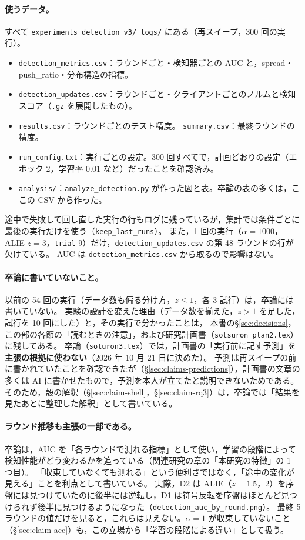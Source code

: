 \documentclass[a4j, dvipdfmx]{jsarticle}  %
\begin{document}
\paragraph{使うデータ。}
すべて \texttt{experiments\_detection\_v3/\_logs/} にある（再スイープ，300 回の実行）。
\begin{itemize}
  \item \texttt{detection\_metrics.csv}：ラウンドごと・検知器ごとの AUC と，spread・push\_ratio・分布構造の指標。
  \item \texttt{detection\_updates.csv}：ラウンドごと・クライアントごとのノルムと検知スコア（\texttt{.gz} を展開したもの）。
  \item \texttt{results.csv}：ラウンドごとのテスト精度。 \texttt{summary.csv}：最終ラウンドの精度。
  \item \texttt{run\_config.txt}：実行ごとの設定。300 回すべてで，計画どおりの設定（エポック 2，学習率 0.01 など）だったことを確認済み。
  \item \texttt{analysis/}：\texttt{analyze\_detection.py} が作った図と表。卒論の表の多くは，ここの CSV から作った。
\end{itemize}
途中で失敗して回し直した実行の行もログに残っているが，集計では条件ごとに最後の実行だけを使う（\texttt{keep\_last\_runs}）。
また，1 回の実行（$\alpha = 1000$，ALIE $z = 3$，\texttt{trial} 9）だけ，\texttt{detection\_updates.csv} の第 48 ラウンドの行が欠けている。
AUC は \texttt{detection\_metrics.csv} から取るので影響はない。

\paragraph{卒論に書いていないこと。}
以前の 54 回の実行（データ数も偏る分け方，$z \le 1$，各 3 試行）は，卒論には書いていない。
実験の設計を変えた理由（データ数を揃えた，$z > 1$ を足した，試行を 10 回にした）と，その実行で分かったことは，
本書の\S\ref{sec:decisions}，この部の各節の「読むときの注意」，および研究計画書（\texttt{sotsuron\_plan2.tex}）に残してある。
卒論（\texttt{soturon3.tex}）では，計画書の「実行前に記す予測」を\textbf{主張の根拠に使わない}（2026 年 10 月 21 日に決めた）。
予測は再スイープの前に書かれていたことを確認できたが（\S\ref{sec:claims-predictions}），計画書の文章の多くは AI に書かせたもので，予測を本人が立てたと説明できないためである。
そのため，殻の解釈（\S\ref{sec:claim-shell}，\S\ref{sec:claim-rq3}）は，卒論では「結果を見たあとに整理した解釈」として書いている。

\paragraph{ラウンド推移も主張の一部である。}
卒論は，AUC を「各ラウンドで測れる指標」として使い，学習の段階によって検知性能がどう変わるかを追っている（関連研究の章の「本研究の特徴」の 1 つ目）。
「収束していなくても測れる」という便利さではなく，「途中の変化が見える」ことを利点として書いている。
実際，D2 は ALIE（$z = 1.5$，2）を序盤には見つけていたのに後半には逆転し，D1 は符号反転を序盤はほとんど見つけられず後半に見つけるようになった（\texttt{detection\_auc\_by\_round.png}）。
最終 5 ラウンドの値だけを見ると，これらは見えない。$\alpha = 1$ が収束していないこと（\S\ref{sec:claim-acc}）も，この立場から「学習の段階による違い」として扱う。
\end{document}
